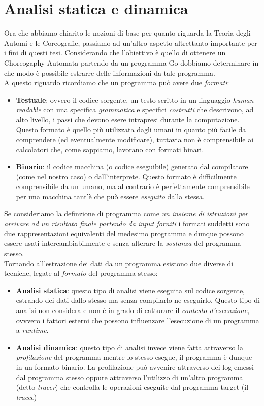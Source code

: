 
\section{Analisi statica e dinamica}
Ora che abbiamo chiarito le nozioni di base per quanto riguarda la Teoria degli Automi e le Coreografie, passiamo ad un'altro aspetto altrettanto importante per i fini di questi tesi. Considerando che l'obiettivo è quello di ottenere un Choreogaphy Automata partendo da un programma Go dobbiamo determinare in che modo è possibile estrarre delle informazioni da tale programma.\\
A questo riguardo ricordiamo che un programma può avere due \emph{formati}:
\begin{itemize}
    \item \textbf{Testuale}: ovvero il codice sorgente, un testo scritto in un linguaggio \emph{human readable} con una specifica \emph{grammatica} e specifici \emph{costrutti} che descrivono, ad alto livello, i passi che devono esere intrapresi durante la computazione. Questo formato è quello più utilizzata dagli umani in quanto più facile da comprendere (ed eventualmente modificare), tuttavia non è comprensibile ai calcolatori che, come sappiamo, lavorano con formati binari.
    \item \textbf{Binario}: il codice macchina (o codice eseguibile) generato dal compilatore (come nel nostro caso) o dall'interprete. Questo formato è difficilmente comprensibile da un umano, ma al contrario è perfettamente comprensibile per una macchina tant'è che può essere \emph{eseguito} dalla stessa.
\end{itemize}
Se consideriamo la definzione di programma come \emph{un insieme di istruzioni per arrivare ad un risultato finale partendo da input forniti} i formati suddetti sono due rappresentazioni equivalenti del medesimo programma e dunque possono essere usati intercambiabilmente e senza alterare la \emph{sostanza} del programma stesso. \bigskip \\
Tornando all'estrazione dei dati da un programma esistono due diverse di tecniche, legate al \emph{formato} del programma stesso:
\begin{itemize}
    \item \textbf{Analisi statica}: questo tipo di analisi viene eseguita sul codice sorgente, estrando dei dati dallo stesso ma senza compilarlo ne eseguirlo. Questo tipo di analisi non considera e non è in grado di catturare il \emph{contesto d'esecuzione}, ovvvero i fattori esterni che possono influenzare l'esecuzione di un programma a \emph{runtime}.
    \item \textbf{Analisi dinamica}: questo tipo di analisi invece viene fatta attraverso la \emph{profilazione} del programma mentre lo stesso esegue, il programma è dunque in un formato binario. La profilazione può avvenire attraverso dei log emessi dal programma stesso oppure attraverso l'utilizzo di un'altro programma (detto \emph{tracer}) che controlla le operazioni eseguite dal programma target (il \emph{tracee})
\end{itemize}
